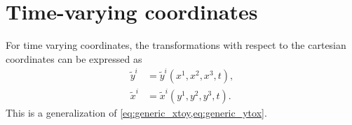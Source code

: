 \documentclass[11pt]{article}
\newcommand{\xtilde}{\tilde{x}}
\newcommand{\ytilde}{\tilde{y}}
\begin{document}
\section{Time-varying coordinates}
For time varying coordinates, the transformations with respect to the cartesian coordinates can be expressed as
\begin{align}
    \ytilde^i &= \ytilde^i(x^1, x^2, x^3, t), \label{eq:generic_xtoy_time} \\
    \xtilde^i &= \xtilde^i(y^1,y^2,y^3, t). \label{eq:generic_ytox_time}
\end{align}
This is a generalization of \cref{eq:generic_xtoy,eq:generic_ytox}.
\end{document}
